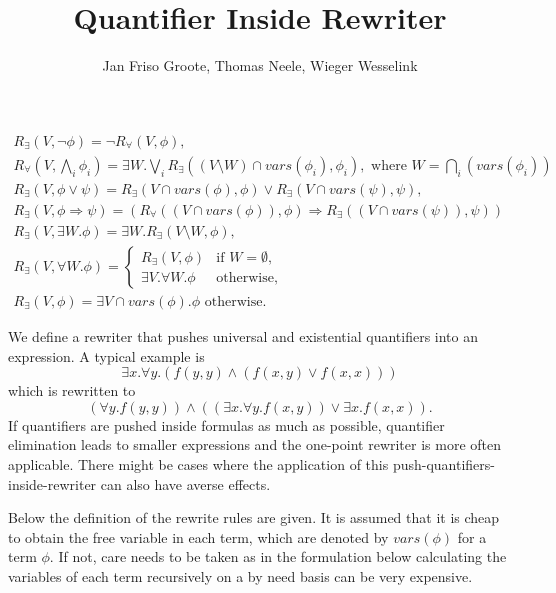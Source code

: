 \documentclass{article}
\title{Quantifier Inside Rewriter}
\author{Jan Friso Groote, Thomas Neele, Wieger Wesselink}
\newcommand{\vars}{\mathit{vars}}
\begin{document}
\maketitle

\[\begin{array}{l}
R_{\exists}(V,\neg \phi)=\neg R_{\forall}(V,\phi),\\
R_{\forall}(V,\bigwedge_i\phi_i) = \exists W.\bigvee_i R_\exists((V \setminus W) \cap \vars(\phi_i), \phi_i),
\text{ where } W = \bigcap_i(\vars(\phi_i)) \\
R_{\exists}(V,\phi\vee \psi)=R_{\exists}(V\cap \vars(\phi),\phi)\vee R_{\exists}(V\cap\vars(\psi),\psi),\\
R_{\exists}(V,\phi\Rightarrow\psi)=
(R_{\forall}((V\cap \vars(\phi)),\phi)\Rightarrow
R_{\exists}((V\cap\vars(\psi)),\psi))\\
R_{\exists}(V,\exists W.\phi)=\exists W.R_{\exists}(V\setminus W,\phi),\\
R_{\exists}(V,\forall W.\phi)=
\left\{\begin{array}{ll}
R_{\exists}(V,\phi)&\textrm{if }W=\emptyset,\\
\exists V.\forall W.\phi&\textrm{otherwise},
\end{array}\right.\\
R_{\exists}(V,\phi)=\exists V\cap\vars(\phi).\phi\textrm{ otherwise}.
\end{array}
\]

We define a rewriter that pushes universal and existential quantifiers into an
expression. A typical example is
\[ \exists x.\forall y.(f(y,y)\wedge (f(x,y)\vee f(x,x))) \]
which is rewritten to
\[(\forall y.f(y,y)) \wedge ((\exists x.\forall y.f(x,y)) \vee \exists x.f(x,x)).\]
If quantifiers are pushed inside formulas as much as possible, quantifier elimination leads to smaller
expressions and the one-point rewriter is more often applicable. There might be cases where the
application of this push-quantifiers-inside-rewriter can also have averse effects.

Below the definition of the rewrite rules are given. It is assumed that it is cheap to obtain the
free variable in each term, which are denoted by $\vars(\phi)$ for a term $\phi$.
If not, care needs to be taken as in the formulation below calculating the
variables of each term recursively on a by need basis can be very expensive.
\end{document}
